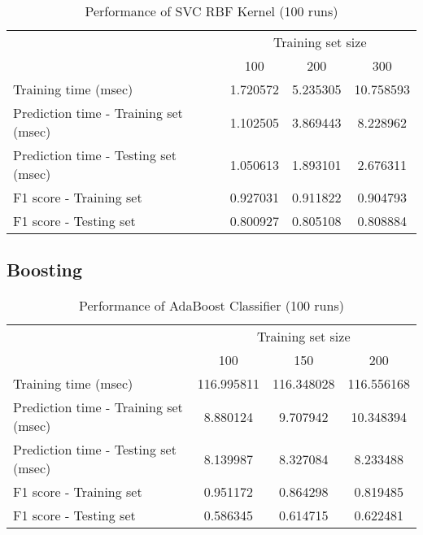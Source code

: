 \documentclass{article}
\begin{document}
	\begin{table}[!ht]
		\centering
		\begin{tabular}{l|ccc}
			\toprule
			{} & \multicolumn{3}{c}{Training set size} \\
			{} &       100 &       200 &       300 \\
			\midrule
			Training time (msec)                  &  1.720572 &  5.235305 &  10.758593 \\
			Prediction time - Training set (msec) &  1.102505 &  3.869443 &   8.228962 \\
			Prediction time - Testing set (msec)  &  1.050613 &  1.893101 &   2.676311 \\
			F1 score - Training set               &  0.927031 &  0.911822 &   0.904793 \\
			F1 score - Testing set                &  0.800927 &  0.805108 &   0.808884 \\
			\bottomrule
		\end{tabular}
		\caption{Performance of SVC RBF Kernel (100 runs)}
		\label{tab:svc_rbf_100}
	\end{table}
	
	\subsection{Boosting}
	
	\begin{table}[!ht]
		\centering
		\begin{tabular}{l|ccc}
			\toprule
			{} & \multicolumn{3}{c}{Training set size} \\
			{} &         100 &         150 &         200 \\
			\midrule
			Training time (msec)                  &  116.995811 &  116.348028 &  116.556168 \\
			Prediction time - Training set (msec) &    8.880124 &    9.707942 &   10.348394 \\
			Prediction time - Testing set (msec)  &    8.139987 &    8.327084 &    8.233488 \\
			F1 score - Training set               &    0.951172 &    0.864298 &    0.819485 \\
			F1 score - Testing set                &    0.586345 &    0.614715 &    0.622481 \\
			\bottomrule
		\end{tabular}
		\caption{Performance of AdaBoost Classifier (100 runs)}
		\label{tab:adaboost_weak_100}
	\end{table}
	
\end{document}

